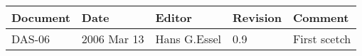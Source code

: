 \begin{table}[h]
\begin{tabular}{|p{2.0cm}|p{2.0cm}|p{3.0cm}|p{1.6cm}|p{5.0cm}|} \hline
Document   & Date        & Editor       & Revision & Comment \\ \hline
DAS-06 & 2006 Mar 13 & Hans G.Essel & 0.9      & First scetch \\ \hline
\end{tabular}
\end{table}
